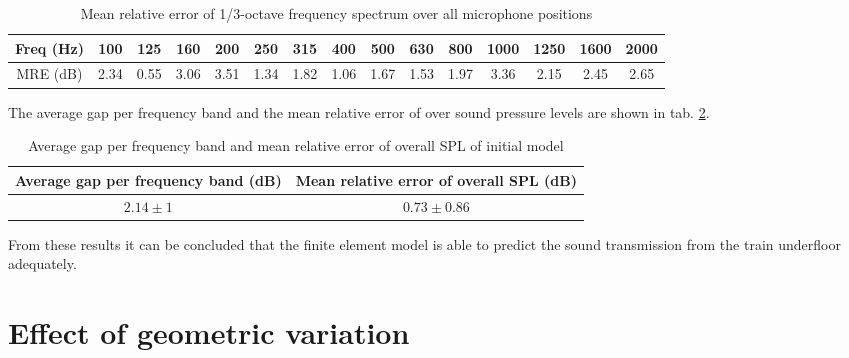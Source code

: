 \begin{table}[H]
	\caption{Mean relative error of 1/3-octave frequency spectrum over all microphone positions}
	\begin{tabular}{c|cccccccccccccc}
		Freq (Hz)           & 100  & 125  & 160  & 200  & 250  & 315  & 400  & 500  & 630  & 800  & 1000 & 1250 & 1600 & 2000 \\ \hline
		MRE (dB) & 2.34 & 0.55 & 3.06 & 3.51 & 1.34 & 1.82 & 1.06 & 1.67 & 1.53 & 1.97 & 3.36 & 2.15 & 2.45 & 2.65
	\end{tabular}
	\label{tab:MRE_spectra}
\end{table}


The average gap per frequency band and the mean relative error of over sound pressure levels are shown in tab. \ref{tab:average_gap}.


\begin{table}[H]
	\centering
	\caption{Average gap per frequency band and mean relative error of overall SPL of initial model}
	\begin{tabular}{c|c}
		Average gap per  frequency band (dB) & Mean relative error of overall SPL (dB) \\ \hline
		$2.14\pm1$                               & $0.73\pm0.86$                             
	\end{tabular}
	\label{tab:average_gap}
\end{table}

From these results it can be concluded that the finite element model is able to predict the sound transmission from the train underfloor adequately.


\section{Effect of geometric variation}

